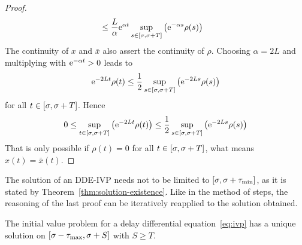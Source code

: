 \begin{proof}
\begin{align*}
            & \leq\frac{L}{\alpha}\mathrm{e}^{\alpha t} \sup_{s\in [\sigma,\sigma+T]}\left(\mathrm{e}^{-\alpha s}\rho(s)\right)
        \end{align*}
        The continuity of $x$ and $\bar{x}$ also assert the continuity of $\rho$.
        Choosing $\alpha=2L$ and multiplying with $\mathrm{e}^{-\alpha t}>0$ leads to
        \begin{equation*}
            \mathrm{e}^{-2Lt}\rho(t) \leq \frac{1}{2}\sup_{s\in [\sigma,\sigma+T]}\left(\mathrm{e}^{-2L s}\rho(s)\right)
        \end{equation*}
        for all $t\in [\sigma,\sigma+T]$. Hence
        \begin{equation*}
            0 \leq \sup_{t\in [\sigma,\sigma+T]}\left(\mathrm{e}^{-2Lt}\rho(t)\right) \leq \frac{1}{2}\sup_{s\in [\sigma,\sigma+T]}\left(\mathrm{e}^{-2L s}\rho(s)\right)
        \end{equation*}
        That is only possible if $\rho(t)=0$ for all $t\in [\sigma,\sigma+T]$, what means $x(t)=\bar{x}(t)$.
    \end{proof}

    The solution of an DDE-IVP needs not to be limited to $[\sigma,\sigma+\tau_{\min}]$, as it is stated by Theorem~\ref{thm:solution-existence}. Like in the method of steps, the reasoning of the last proof can be iteratively reapplied to the solution obtained.

    \begin{corollary}[Continuability]\label{cor:continuability}
        The initial value problem for a delay differential equation~\eqref{eq:ivp} has a unique solution on $[\sigma-\tau_{\max},\sigma+S]$ with $S\geq T$.
    \end{corollary}

